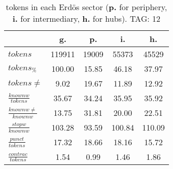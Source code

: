 \begin{table}[h!]
\begin{center}
\begin{tabular}{| l | c | c | c | c |}\hline
 & g. & p. & i. & h. \\\hline
$tokens$ & 119911  & 19009  & 55373  & 45529 \\\hline
$tokens_{\%}$ & 100.00  & 15.85  & 46.18  & 37.97 \\\hline
$tokens \neq$ & 9.02  & 19.67  & 11.89  & 12.92 \\\hline
$\frac{knownw}{tokens}$ & 35.67  & 34.24  & 35.95  & 35.92 \\\hline
$\frac{knownw \neq}{knownw}$ & 13.75  & 31.81  & 20.00  & 22.51 \\\hline
$\frac{stopw}{knownw}$ & 103.28  & 93.59  & 100.84  & 110.09 \\\hline
$\frac{punct}{tokens}$ & 17.32  & 18.66  & 18.16  & 15.72 \\\hline
$\frac{contrac}{tokens}$ & 1.54  & 0.99  & 1.46  & 1.86 \\\hline
\end{tabular}
\caption{tokens in each Erd\"os sector ({{\bf p.}} for periphery, {{\bf i.}} for intermediary, 
    {{\bf h.}} for hubs). TAG: 12}
\end{center}
\end{table}